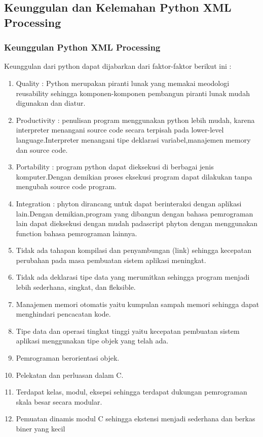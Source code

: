 \subsection{Keunggulan dan Kelemahan Python XML Processing}
\subsubsection{Keunggulan Python XML Processing}
Keunggulan dari python dapat dijabarkan dari faktor-faktor berikut ini :

\begin{enumerate}
\item Quality : Python merupakan piranti lunak yang memakai meodologi reusability sehingga komponen-komponen pembangun piranti      lunak mudah digunakan dan diatur.
\item Productivity : penulisan program menggunakan python lebih mudah, karena interpreter menangani source code secara terpisah pada lower-level language.Interpreter menangani tipe deklarasi variabel,manajemen memory dan source code.
\item Portability : program python dapat dieksekusi di berbagai jenis komputer.Dengan demikian proses eksekusi program dapat dilakukan tanpa mengubah source code program.
\item Integration : phyton dirancang untuk dapat berinteraksi dengan aplikasi lain.Dengan demikian,program yang dibangun dengan bahasa pemrograman lain dapat dieksekusi dengan mudah padascript phyton dengan menggunakan function bahasa pemrograman lainnya.
\item Tidak ada tahapan kompilasi dan penyambungan (link) sehingga kecepatan perubahan pada masa pembuatan sistem aplikasi meningkat.
\item Tidak ada deklarasi tipe data yang merumitkan sehingga program menjadi lebih sederhana, singkat, dan fleksible.
\item Manajemen memori otomatis yaitu kumpulan sampah memori sehingga dapat menghindari pencacatan kode.
\item Tipe data dan operasi tingkat tinggi yaitu kecepatan pembuatan sistem aplikasi menggunakan tipe objek yang telah ada.
\item Pemrograman berorientasi objek.
\item Pelekatan dan perluasan dalam C.
\item Terdapat kelas, modul, eksepsi sehingga terdapat dukungan pemrograman skala besar secara modular.
\item Pemuatan dinamis modul C sehingga ekstensi menjadi sederhana dan berkas biner yang kecil

\end{enumerate}
